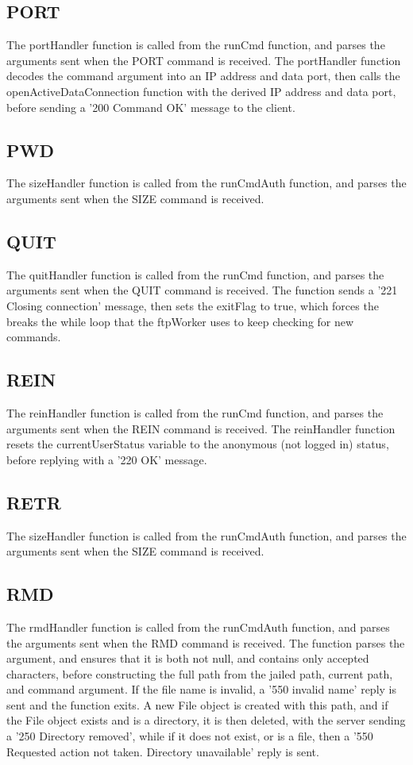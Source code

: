 \documentclass[11pt,a4paper,titlepage]{article}
\begin{document}
\subsection{PORT}
The portHandler function is called from the runCmd function, and parses the arguments sent when the PORT command is received. The portHandler function decodes the command argument into an IP address and data port, then calls the openActiveDataConnection function with the derived IP address and data port, before sending a '200 Command OK' message to the client.

\subsection{PWD}
The sizeHandler function is called from the runCmdAuth function, and parses the arguments sent when the SIZE command is received.

\subsection{QUIT}
The quitHandler function is called from the runCmd function, and parses the arguments sent when the QUIT command is received. The function sends a '221 Closing connection' message, then sets the exitFlag to true, which forces the breaks the while loop that the ftpWorker uses to keep checking for new commands.

\subsection{REIN}
The reinHandler function is called from the runCmd function, and parses the arguments sent when the REIN command is received. The reinHandler function resets the currentUserStatus variable to the anonymous (not logged in) status, before replying with a '220 OK' message.

\subsection{RETR}
The sizeHandler function is called from the runCmdAuth function, and parses the arguments sent when the SIZE command is received.

\subsection{RMD}
The rmdHandler function is called from the runCmdAuth function, and parses the arguments sent when the RMD command is received. The function parses the argument, and ensures that it is both not null, and contains only accepted characters, before constructing the full path from the jailed path, current path, and command argument. If the file name is invalid, a '550 invalid name' reply is sent and the function exits. A new File object is created with this path, and if the File object exists and is a directory, it is then deleted, with the server sending a '250 Directory removed', while if it does not exist, or is a file, then a '550 Requested action not taken. Directory unavailable' reply is sent.
\end{document}
